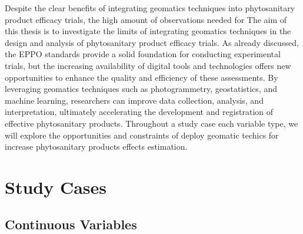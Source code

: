 \documentclass[12pt,a4paper,oneside]{report}
\begin{document}
Despite the clear benefits of integrating geomatics techniques into phytosanitary
product efficacy trials, the high amount of observations needed for 
The aim of this thesis is to investigate the limits of integrating
geomatics techniques in the design and analysis of phytosanitary product efficacy trials.
As already discussed, the EPPO standards provide a solid foundation for conducting experimental trials,
but the increasing availability of digital tools and technologies offers new opportunities to enhance
the quality and efficiency of these assessments. By leveraging geomatics techniques such as photogrammetry,
geostatistics, and machine learning, researchers can improve data collection, analysis, and interpretation,
ultimately accelerating the development and registration of effective phytosanitary products.
Throughout a study case each variable type, we will explore the opportunities and
constraints of deploy geomatic techics for increase phytosanitary products effects
estimation.




\chapter{Study Cases}
\section{Continuous Variables}














\end{document}
